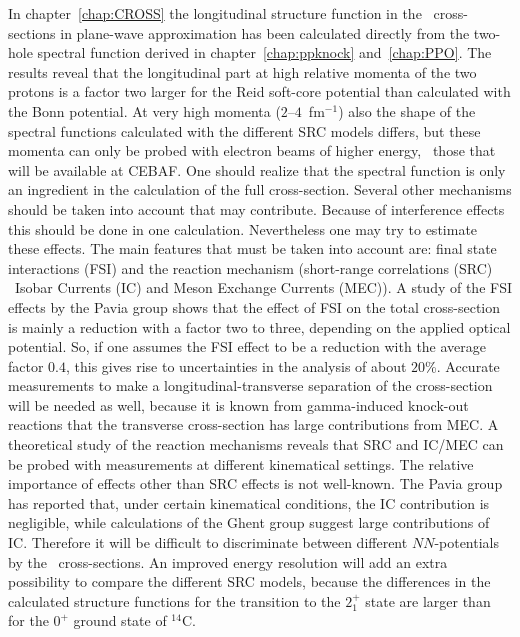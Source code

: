 In chapter~\ref{chap:CROSS} the longitudinal structure function in the 
\eepp\ cross-sections in plane-wave approximation has been calculated directly 
from the two-hole spectral function
derived in chapter~\ref{chap:ppknock} and~\ref{chap:PPO}. 
The results reveal that the longitudinal part 
at high relative momenta of the two protons is a factor two larger for the Reid
soft-core potential than calculated with the Bonn potential. 
At very high momenta ($2$--$4$~fm$^{-1}$) also 
the shape of the spectral functions calculated with the different SRC models 
differs, but these momenta can only be probed with electron beams of higher 
energy, \eg\ those that will be available at CEBAF.
One should realize that the spectral function is only an ingredient in the
calculation of the 
full cross-section. Several other mechanisms should be taken into account
that may contribute.
Because of interference effects this should be done in one calculation.
Nevertheless one may try to  estimate these effects. 
The main features
that must be taken into account are: final state interactions (FSI) and
the reaction mechanism (short-range correlations (SRC) 
\vs\ Isobar Currents (IC) and Meson Exchange 
Currents (MEC)). A study of the FSI effects by the Pavia group shows that
the effect of FSI on the total cross-section is mainly a reduction with a 
factor two to three,
depending on the applied optical potential\cite{GP91}. 
So, if one assumes the FSI effect to be a reduction with the average factor 
$0.4$, this gives rise to uncertainties in the analysis of about $20$\%. 
Accurate measurements to make a longitudinal-transverse separation 
of the cross-section will be needed as well, because it is known from 
gamma-induced knock-out reactions that the transverse cross-section has 
large contributions from MEC.
A theoretical study\cite{GP91} of the reaction mechanisms reveals that 
SRC and IC/MEC can be 
probed with measurements at different kinematical settings. The relative 
importance of effects other than SRC effects is not well-known. 
The Pavia group\cite{GP91} has
reported that, under certain kinematical conditions, the IC contribution is 
negligible, while calculations of the Ghent group\cite{Ry94} 
suggest large contributions of IC.
Therefore it will be difficult to discriminate between 
different $NN$-potentials by the \eepp\ cross-sections.
An improved energy resolution will add an extra possibility to compare the 
different SRC models,  because the differences in the calculated
structure functions for the
transition to the $2_1^+$ state are larger than for the $0^+$ ground state of
$^{14}$C.

